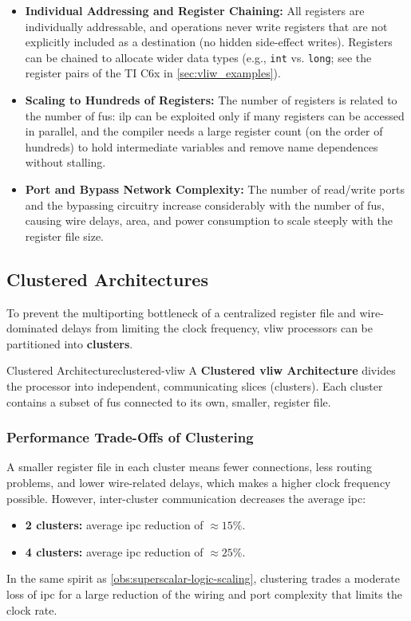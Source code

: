 \begin{itemize}
    \item \textbf{Individual Addressing and Register Chaining:} All registers are individually addressable, and operations never write registers that are not explicitly included as a destination (no hidden side-effect writes). Registers can be chained to allocate wider data types (e.g., \texttt{int} vs. \texttt{long}; see the register pairs of the TI C6x in \cref{sec:vliw_examples}).
    \item \textbf{Scaling to Hundreds of Registers:} The number of registers is related to the number of \glspl{fu}: \gls{ilp} can be exploited only if many registers can be accessed in parallel, and the compiler needs a large register count (on the order of hundreds) to hold intermediate variables and remove name dependences without stalling.
    \item \textbf{Port and Bypass Network Complexity:} The number of read/write ports and the bypassing circuitry increase considerably with the number of \glspl{fu}, causing wire delays, area, and power consumption to scale steeply with the register file size.
\end{itemize}

\subsection{Clustered  Architectures}

To prevent the multiporting bottleneck of a centralized register file and wire-dominated delays from limiting the clock frequency, \gls{vliw} processors can be partitioned into \textbf{clusters}.

\begin{definition}{Clustered  Architecture}{clustered-vliw}
    A \textbf{Clustered \gls{vliw} Architecture} divides the processor into independent, communicating slices (clusters). Each cluster contains a subset of \glspl{fu} connected to its own, smaller, register file.
\end{definition}

\subsubsection{Performance Trade-Offs of Clustering}
A smaller register file in each cluster means fewer connections, less routing problems, and lower wire-related delays, which makes a higher clock frequency possible. However, inter-cluster communication decreases the average \gls{ipc}:
\begin{itemize}
    \item \textbf{2 clusters:} average \gls{ipc} reduction of $\approx 15\%$.
    \item \textbf{4 clusters:} average \gls{ipc} reduction of $\approx 25\%$.
\end{itemize}
In the same spirit as \cref{obs:superscalar-logic-scaling}, clustering trades a moderate loss of \gls{ipc} for a large reduction of the wiring and port complexity that limits the clock rate.

